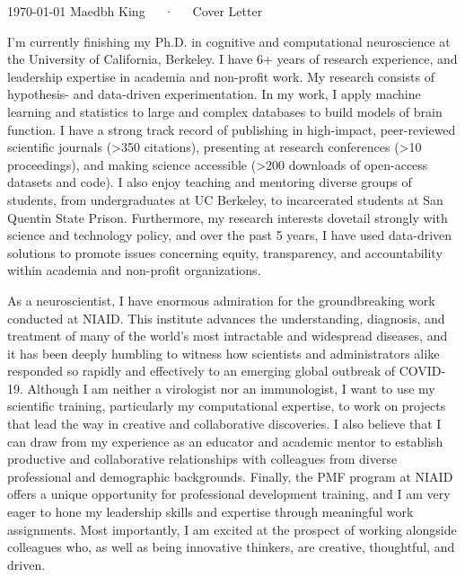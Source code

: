\documentclass[9pt, a4paper]{maedbh-cv}
\begin{document}
\makecvheader[R]

\makecvfooter
  {\today}
  {Maedbh King~~~·~~~Cover Letter}
  {}
  
\makelettertitle

\begin{cvletter}

I'm currently finishing my Ph.D. in cognitive and computational neuroscience at the University of California, Berkeley. I have 6+ years of research experience, and leadership expertise in academia and non-profit work. My research consists of hypothesis- and data-driven experimentation. In my work, I apply machine learning and statistics to large and complex databases to build models of brain function. I have a strong track record of publishing in high-impact, peer-reviewed scientific journals (>350 citations), presenting at research conferences (>10 proceedings), and making science accessible (>200 downloads of open-access datasets and code). I also enjoy teaching and mentoring diverse groups of students, from undergraduates at UC Berkeley, to incarcerated students at San Quentin State Prison. Furthermore, my research interests dovetail strongly with science and technology policy, and over the past 5 years, I have used data-driven solutions to promote issues concerning equity, transparency, and accountability within academia and non-profit organizations. 

As a neuroscientist, I have enormous admiration for the groundbreaking work conducted at NIAID. This institute advances the understanding, diagnosis, and treatment of many of the world's most intractable and widespread diseases, and it has been deeply humbling to witness how scientists and administrators alike responded so rapidly and effectively to an emerging global outbreak of COVID-19. Although I am neither a virologist nor an immunologist, I want to use my scientific training, particularly my computational expertise, to work on projects that lead the way in creative and collaborative discoveries. I also believe that I can draw from my experience as an educator and academic mentor to establish productive and collaborative relationships with colleagues from diverse professional and demographic backgrounds. Finally, the PMF program at NIAID offers a unique opportunity for professional development training, and I am very eager to hone my leadership skills and expertise through meaningful work assignments. Most importantly, I am excited at the prospect of working alongside colleagues who, as well as being innovative thinkers, are creative, thoughtful, and driven. 


\end{cvletter}
\end{document}
